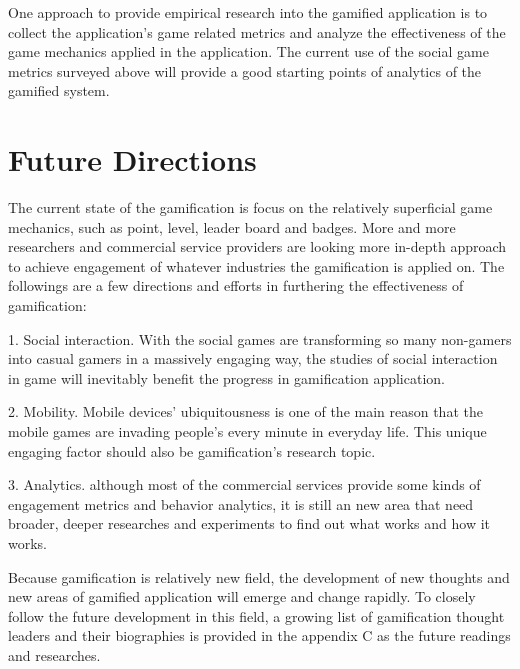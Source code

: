 One approach to provide empirical research into the gamified application is to collect the application's game related metrics and analyze the effectiveness of the game mechanics applied in the application. The current use of the social game metrics surveyed above will provide a good starting points of analytics of the gamified system.

\section {Future Directions}

The current state of the gamification is focus on the relatively superficial game mechanics, such as point, level, leader board and badges. More and more researchers and commercial service providers are looking more in-depth approach to achieve engagement of whatever industries the gamification is applied on. The followings are a few directions and efforts in furthering the effectiveness of gamification:

1. Social interaction.  With the social games are transforming so many non-gamers into casual gamers in a massively engaging way, the studies of social interaction in game will inevitably benefit the progress in gamification application.

2. Mobility. Mobile devices' ubiquitousness is one of the main reason that the mobile games are invading people's every minute in everyday life. This unique engaging factor should also be gamification's research topic. 

3. Analytics. although most of the commercial services provide some kinds of engagement metrics and behavior analytics, it is still an new area that need broader, deeper researches and experiments to find out what works and how it works. 


Because gamification is relatively new field, the development of new thoughts and new areas of gamified application will emerge and change rapidly. To closely follow the future development in this field, a growing list of gamification thought leaders and their biographies is provided in the appendix C as the future readings and researches.

